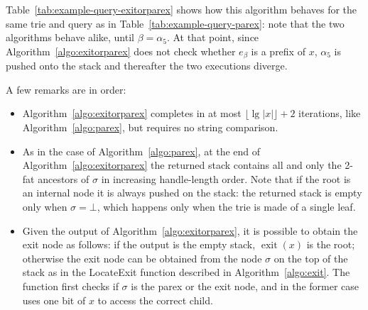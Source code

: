 \documentclass[a4paper]{article}
\newcommand{\exit}[1]{\operatorname{exit}(#1)}
\newcommand{\?}{\mskip1.5mu}
\begin{document}
Table~\ref{tab:example-query-exitorparex} shows how this algorithm behaves for the same trie
and query as in Table~\ref{tab:example-query-parex}: note that the two algorithms behave alike,
until $\beta=\alpha_5$. At that point, since Algorithm~\ref{algo:exitorparex} does not check
whether $e_\beta$ is a prefix of $x$, $\alpha_5$ is pushed onto the stack and thereafter the two executions
diverge. 

\begin{table}
\centering

\vspace*{.5cm}
\caption{\label{tab:example-query-exitorparex}Execution of Algorithm~\ref{algo:exitorparex} on the trie of Figure~\ref{fig:large-example}
with the same input as in Table~\ref{tab:example-query-parex}: note how the two algorithms start
alike, but diverge after hitting the exit node $\alpha_5$.}
\end{table}

A few remarks are in order:
\begin{itemize}
  \item Algorithm~\ref{algo:exitorparex} completes in at most $\lfloor\lg|x|\rfloor+2$ iterations, like
  Algorithm~\ref{algo:parex}, but requires no string comparison.  
    \item As in the case of Algorithm~\ref{algo:parex}, at the end of Algorithm~\ref{algo:exitorparex} the returned stack contains
  all and only the 2-fat ancestors of $\sigma$ in increasing handle-length order. Note that if the root is an
  internal node it is always pushed on the stack: the returned stack is empty only when $\sigma=\bot$, which
  happens only when the trie is made of a single leaf.
  \item Given the output of Algorithm~\ref{algo:exitorparex}, it is possible to 
  obtain the exit node as follows: if the output is the empty stack, $\exit x$ is the root;
  otherwise the exit node can be obtained from the node $\sigma$ on the top of the stack as in the LocateExit function described in Algorithm~\ref{algo:exit}.
  The function first checks if $\sigma$ is the parex or the exit node, and in the former case uses
  one bit of $x$ to access the correct child.
\end{itemize}

\begin{Algorithm}
\begin{algorithmic}
\STATE{\textbf{Output:} $\exit x$} 
\ENDIF
{}
	\ELSE
	\ENDIF
\ELSE
\ENDIF
\end{algorithmic}
\caption{\label{algo:exit}This function locates the exit node of $x$ using Algorithm~\ref{algo:exitorparex}.}
\end{Algorithm}
\end{document}
